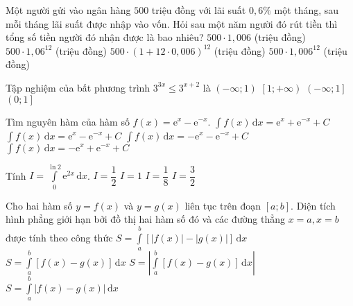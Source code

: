 \begin{ex}%
Một người gửi vào ngân hàng $500$ triệu đồng với lãi suất $0{,}6\%$ một tháng, sau mỗi tháng lãi suất được nhập vào vốn. Hỏi sau một năm người đó rút tiền thì tổng số tiền người đó nhận được là bao nhiêu?
\choice
{$500 \cdot 1{,}006$ (triệu đồng)}
{$500 \cdot 1{,}06^{12}$ (triệu đồng)}
{$500 \cdot (1+12\cdot 0{,}006)^{12}$ (triệu đồng)}
{\True $500 \cdot 1{,}006^{12}$ (triệu đồng)}
\end{ex}

\begin{ex}%
Tập nghiệm của bất phương trình $3^{3x} \leq 3^{x+2}$ là
\choice
{$\left(-\infty ; 1\right ) $}
{$\left[1; +\infty \right )$}
{\True $\left(-\infty ; 1\right]$}
{$\left(0 ; 1\right]$}
\end{ex}  

\begin{ex}%
Tìm nguyên hàm của hàm số $f(x)=\mathrm{e}^x - \mathrm{e}^{-x}$.
\choice
{\True $\displaystyle \int f(x) \mathrm{\,d}x = \mathrm{e}^x + \mathrm{e}^{-x} + C$}
{$\displaystyle \int f(x) \mathrm{\,d}x = \mathrm{e}^x - \mathrm{e}^{-x} + C$}
{$\displaystyle \int f(x) \mathrm{\,d}x = -\mathrm{e}^x - \mathrm{e}^{-x} + C$}
{$\displaystyle \int f(x) \mathrm{\,d}x = -\mathrm{e}^x + \mathrm{e}^{-x} + C$}
\end{ex}

\begin{ex}%
Tính $I=\displaystyle\int\limits^{\ln 2}_{0} \mathrm{e}^{2x} \mathrm{\,d} x$.
\choice
{$I=\dfrac{1}{2}$}
{$I=1$}
{$I=\dfrac{1}{8}$}
{\True $I=\dfrac{3}{2}$}
\end{ex}  

\begin{ex}%
Cho hai hàm số $y=f(x)$ và $y=g(x)$ liên tục trên đoạn $[a;b].$ Diện tích hình phẳng giới hạn bởi đồ thị hai hàm số đó và các đường thẳng $x=a,x=b$ được tính theo công thức
\choice
{$S=\displaystyle\int\limits^{b}_{a} \left[\left |f(x)\right |-\left |g(x)\right |\right ] \mathrm{\,d} x $}
{$S=\displaystyle\int\limits^{b}_{a} \left[f(x)-g(x)\right ] \mathrm{\,d} x $}
{$S=\left |\displaystyle\int\limits^{b}_{a} \left[f(x)-g(x)\right] \mathrm{\,d} x \right |$}
{\True $S=\displaystyle\int\limits^{b}_{a} \left|f(x)-g(x)\right| \mathrm{\,d} x $}
\end{ex}  

